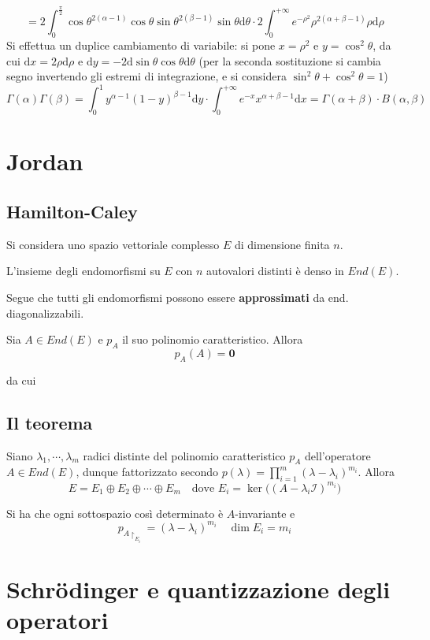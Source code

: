 \documentclass[10pt, oneside]{book}
\theoremstyle{plain}
\begin{document}
\[= 2 \int_0^{\frac{\pi}{2}} \cos \theta^{2(\alpha - 1)} \cos \theta \sin \theta ^{2(\beta -1)} \sin \theta \textrm{d}\theta \cdot 2 \int_0^{+\infty} e^{-\rho^2} \rho^{2(\alpha + \beta -1)}\rho  \textrm{d}\rho\]
Si effettua un duplice cambiamento di variabile: si pone $x = \rho^2$ e $y = \cos^2\theta$, da cui $ \textrm{d}x = 2\rho  \textrm{d}\rho$ e $ \textrm{d}y = - 2  \textrm{d} \sin \theta \cos \theta  \textrm{d}\theta$ (per la seconda sostituzione si cambia segno invertendo gli estremi di integrazione, e si considera $\sin^2\theta + \cos^2\theta = 1$)
\[\Gamma(\alpha)\Gamma(\beta) = \int_0^1 y^{\alpha - 1} (1-y)^{\beta - 1}\textrm{d}y \cdot \int_0^{+\infty} e^{-x} x^{\alpha + \beta -1}\textrm{d}x = \Gamma(\alpha + \beta) \cdot B(\alpha, \beta)\]

\section{Jordan}
\subsection{Hamilton-Caley}
Si considera uno spazio vettoriale complesso $E$ di dimensione finita $n$. 
\begin{lem}
L'insieme degli endomorfismi su $E$ con $n$ autovalori distinti è denso in $End(E)$.
\end{lem}
Segue che tutti gli endomorfismi possono essere \textbf{approssimati} da end. diagonalizzabili.
\begin{ther}[di H.-C.]
Sia $A \in End(E)$ e $p_A$ il suo polinomio caratteristico. Allora 
\[p_A(A) = \mathbf{0}\]
\end{ther}
da cui
\subsection{Il teorema}
\begin{ther}
Siano $\lambda_1, \cdots, \lambda_m$ radici distinte del polinomio caratteristico $p_A$ dell'operatore $A \in End(E)$, dunque fattorizzato secondo $\displaystyle p(\lambda) = \prod\limits_{i=1}^m (\lambda - \lambda_i)^{m_i}$. Allora
\[E = E_1 \oplus E_2 \oplus \cdots \oplus E_m \quad \textrm{dove } E_i = \ker\big((A - \lambda_i \mathcal{I})^{m_i}\big)\]
\end{ther}
Si ha che ogni sottospazio così determinato è $A$-invariante e 
\[p_{\displaystyle A\restriction_{E_i}} = (\lambda - \lambda_i)^{m_i} \quad \dim E_i = m_i\]


\section{Schr\"odinger e quantizzazione degli operatori}
\end{document}

